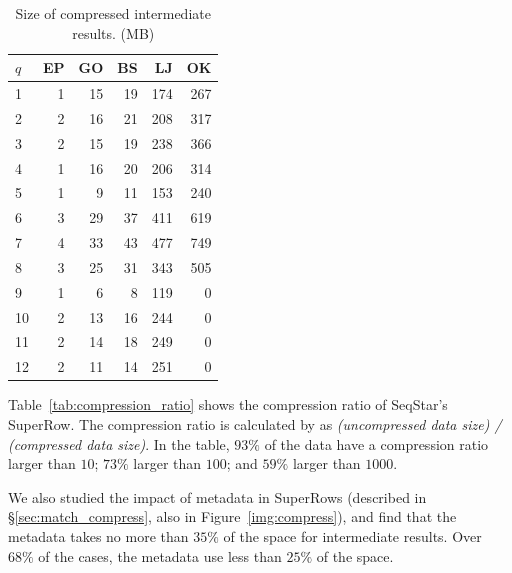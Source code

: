 \begin{table}
  \caption{Size of compressed intermediate results. (MB)}\label{tab:compressed}
  \begin{tabular}{lrrrrr}
    \toprule
    $q$ &  EP &  GO &  BS &  LJ &  OK \\
    \midrule
    1  &   1 &  15 &  19 & 174 & 267 \\
    2  &   2 &  16 &  21 & 208 & 317 \\
    3  &   2 &  15 &  19 & 238 & 366 \\
    4  &   1 &  16 &  20 & 206 & 314 \\
    5  &   1 &   9 &  11 & 153 & 240 \\
    6  &   3 &  29 &  37 & 411 & 619 \\
    7  &   4 &  33 &  43 & 477 & 749 \\
    8  &   3 &  25 &  31 & 343 & 505 \\
    9  &   1 &   6 &   8 & 119 & 0 \\
    10 &   2 &  13 &  16 & 244 & 0 \\
    11 &   2 &  14 &  18 & 249 & 0 \\
    12 &   2 &  11 &  14 & 251 & 0 \\
    \bottomrule
  \end{tabular}
\end{table}

Table~\ref{tab:compression_ratio} shows the compression ratio of SeqStar's SuperRow.
The compression ratio is calculated by as \emph{(uncompressed data size) / (compressed data size)}.
In the table, $93\%$ of the data have a compression ratio larger than $10$;
$73\%$ larger than $100$; and $59\%$ larger than $1000$.

We also studied the impact of metadata in SuperRows (described in \S\ref{sec:match_compress}, also in Figure~\ref{img:compress}),
and find that the metadata takes no more than $35\%$ of the space for intermediate results.
Over $68\%$ of the cases, the metadata use less than $25\%$ of the space.

